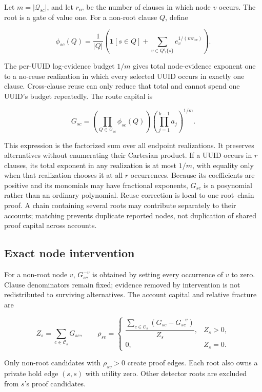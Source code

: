 \documentclass[runningheads]{llncs}
\begin{document}
Let \(m=|\mathcal Q_{sc}|\), and let \(r_{vc}\) be the number of clauses in which node \(v\) occurs. The root is a gate of value one. For a non-root clause \(Q\), define

\[
\phi_{sc}(Q)=
\frac{1}{|Q|}
\left(
\mathbf{1}[s\in Q]
+
\sum_{v\in Q\setminus\{s\}}
e_v^{1/(m r_{vc})}
\right).
\]

The per-UUID log-evidence budget \(1/m\) gives total node-evidence exponent one to a no-reuse realization in which every selected UUID occurs in exactly one clause. Cross-clause reuse can only reduce that total and cannot spend one UUID's budget repeatedly. The route capital is

\[
G_{sc}=
\left(\prod_{Q\in\mathcal Q_{sc}}\phi_{sc}(Q)\right)
\left(\prod_{j=1}^{k-1}a_j\right)^{1/m}.
\]

This expression is the factorized sum over all endpoint realizations. It preserves alternatives without enumerating their Cartesian product. If a UUID occurs in \(r\) clauses, its total exponent in any realization is at most \(1/m\), with equality only when that realization chooses it at all \(r\) occurrences.
Because its coefficients are positive and its monomials may have fractional exponents, \(G_{sc}\) is a posynomial rather than an ordinary polynomial.
Reuse correction is local to one root--chain proof. A chain containing several roots may contribute separately to their accounts; matching prevents duplicate reported nodes, not duplication of shared proof capital across accounts.

\subsection{Exact node intervention}

For a non-root node \(v\), \(G_{sc}^{-v}\) is obtained by setting every occurrence of \(v\) to zero. Clause denominators remain fixed; evidence removed by intervention is not redistributed to surviving alternatives. The account capital and relative fracture are

\[
Z_s=\sum_{c\in\mathcal C_s}G_{sc},
\qquad
\rho_{sv}=
\begin{cases}
\dfrac{\sum_{c\in\mathcal C_s}
(G_{sc}-G_{sc}^{-v})}{Z_s},&Z_s>0,\\[8pt]
0,&Z_s=0.
\end{cases}
\]

Only non-root candidates with \(\rho_{sv}>0\) create proof edges. Each root also owns a private hold edge \((s,s)\) with utility zero. Other detector roots are excluded from \(s\)'s proof candidates.
\end{document}
